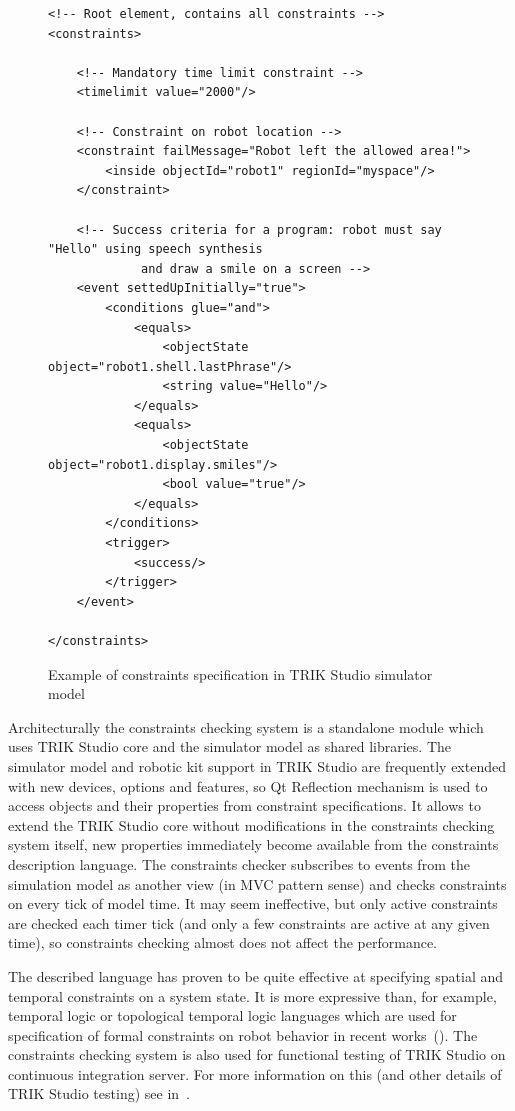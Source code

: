 \documentclass[conference]{IEEEtran}
\begin{document}
\captionsetup[figure]{name=Listing}
\setcounter{figure}{0}

\begin{figure}[!t]
\begin{verbatim}
<!-- Root element, contains all constraints -->
<constraints>

    <!-- Mandatory time limit constraint -->
    <timelimit value="2000"/>

    <!-- Constraint on robot location -->
    <constraint failMessage="Robot left the allowed area!">
        <inside objectId="robot1" regionId="myspace"/>
    </constraint>

    <!-- Success criteria for a program: robot must say "Hello" using speech synthesis 
		     and draw a smile on a screen -->
    <event settedUpInitially="true">
        <conditions glue="and">
            <equals>
                <objectState object="robot1.shell.lastPhrase"/>
                <string value="Hello"/>
            </equals>
            <equals>
                <objectState object="robot1.display.smiles"/>
                <bool value="true"/>
            </equals>
        </conditions>
        <trigger>
            <success/>
        </trigger>
    </event>

</constraints>
\end{verbatim}
\caption{Example of constraints specification in TRIK Studio simulator model}
\label{code:constraints}
\end{figure}

Architecturally the constraints checking system is a standalone module which uses TRIK Studio core and the simulator model as shared libraries. The simulator model and robotic kit support in TRIK Studio are frequently extended with new devices, options and features, so Qt Reflection mechanism is used to access objects and their properties from constraint specifications. It allows to extend the TRIK Studio core without modifications in the constraints checking system itself, new properties immediately become available from the constraints description language. The constraints checker subscribes to events from the simulation model as another view (in MVC pattern sense) and checks constraints on every tick of model time. It may seem ineffective, but only active constraints are checked each timer tick (and only a few constraints are active at any given time), so constraints checking almost does not affect the performance.

The described language has proven to be quite effective at specifying spatial and temporal constraints on a system state. It is more expressive than, for example, temporal logic or topological temporal logic languages which are used for specification of formal constraints on robot behavior in recent works~(\cite{mordvinov2016formal,kress2007s,bugaichenko2007development,dmitriev2013adaptation}). The constraints checking system is also used for functional testing of TRIK Studio on continuous integration server. For more information on this (and other details of TRIK Studio testing) see in~\cite{mordvinov2016testing}.
\end{document}

